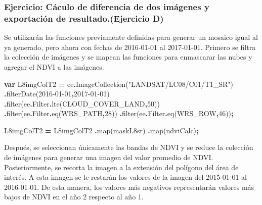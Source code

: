 \documentclass[
  12pt,
  letterpaper,
  twoside]{book}
\newenvironment{Shaded}{\begin{snugshade}}{\end{snugshade}}
\newcommand{\AttributeTok}[1]{\textcolor[rgb]{0.77,0.63,0.00}{#1}}
\newcommand{\DecValTok}[1]{\textcolor[rgb]{0.00,0.00,0.81}{#1}}
\newcommand{\FunctionTok}[1]{\textcolor[rgb]{0.00,0.00,0.00}{#1}}
\newcommand{\KeywordTok}[1]{\textcolor[rgb]{0.13,0.29,0.53}{\textbf{#1}}}
\newcommand{\NormalTok}[1]{#1}
\newcommand{\OperatorTok}[1]{\textcolor[rgb]{0.81,0.36,0.00}{\textbf{#1}}}
\newcommand{\StringTok}[1]{\textcolor[rgb]{0.31,0.60,0.02}{#1}}
\begin{document}
\hypertarget{ejercicio-cuxe1culo-de-diferencia-de-dos-imuxe1genes-y-exportaciuxf3n-de-resultado.ejercicio-d}{%
\subsubsection{Ejercicio: Cáculo de diferencia de dos imágenes y exportación de resultado.(Ejercicio D)}\label{ejercicio-cuxe1culo-de-diferencia-de-dos-imuxe1genes-y-exportaciuxf3n-de-resultado.ejercicio-d}}

Se utilizarán las funciones previamente definidas para generar un mosaico igual al ya generado, pero ahora con fechas de 2016-01-01 al 2017-01-01. Primero se filtra la colección de imágenes y se mapean las funciones para enmascarar las nubes y agregar el NDVI a las imágenes.

\begin{Shaded}
\begin{Highlighting}[]
\KeywordTok{var}\NormalTok{ L8imgColT2 }\OperatorTok{=}\NormalTok{ ee}\OperatorTok{.}\FunctionTok{ImageCollection}\NormalTok{(}\StringTok{"LANDSAT/LC08/C01/T1\_SR"}\NormalTok{)}
  \OperatorTok{.}\FunctionTok{filterDate}\NormalTok{(}\StringTok{\textquotesingle{}2016{-}01{-}01\textquotesingle{}}\OperatorTok{,}\StringTok{\textquotesingle{}2017{-}01{-}01\textquotesingle{}}\NormalTok{)}
  \OperatorTok{.}\FunctionTok{filter}\NormalTok{(ee}\OperatorTok{.}\AttributeTok{Filter}\OperatorTok{.}\FunctionTok{lte}\NormalTok{(}\StringTok{\textquotesingle{}CLOUD\_COVER\_LAND\textquotesingle{}}\OperatorTok{,}\DecValTok{50}\NormalTok{))}
  \OperatorTok{.}\FunctionTok{filter}\NormalTok{(ee}\OperatorTok{.}\AttributeTok{Filter}\OperatorTok{.}\FunctionTok{eq}\NormalTok{(}\StringTok{\textquotesingle{}WRS\_PATH\textquotesingle{}}\OperatorTok{,}\DecValTok{28}\NormalTok{))}
  \OperatorTok{.}\FunctionTok{filter}\NormalTok{(ee}\OperatorTok{.}\AttributeTok{Filter}\OperatorTok{.}\FunctionTok{eq}\NormalTok{(}\StringTok{\textquotesingle{}WRS\_ROW\textquotesingle{}}\OperatorTok{,}\DecValTok{46}\NormalTok{))}\OperatorTok{;}

\NormalTok{L8imgColT2 }\OperatorTok{=}\NormalTok{ L8imgColT2}
  \OperatorTok{.}\FunctionTok{map}\NormalTok{(maskL8sr)}
  \OperatorTok{.}\FunctionTok{map}\NormalTok{(ndviCalc)}\OperatorTok{;}
\end{Highlighting}
\end{Shaded}

Después, se seleccionan únicamente las bandas de NDVI y se reduce la colección de imágenes para generar una imagen del valor promedio de NDVI. Posteriormente, se recorta la imagen a la extensión del polígono del área de interés. A esta imagen se le restarán los valores de la imagen del 2015-01-01 al 2016-01-01. De esta manera, los valores más negativos representarán valores más bajos de NDVI en el año 2 respecto al año 1.
\end{document}
